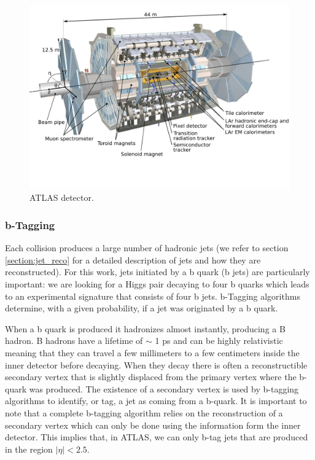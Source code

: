 \begin{figure}
	\centering
	\includegraphics[trim={0cm 3.5cm 0cm 0},clip,width=\textwidth]{./Figures/ATLASsvg3.png}
	\caption{ATLAS detector.}
	\label{fig:ATLAS_detector}
\end{figure} 

\subsubsection{b-Tagging}

Each collision produces a large number of hadronic jets (we refer to section \ref{section:jet_reco} for a detailed description of jets and how they are reconstructed). For this work, jets initiated by a b quark (b jets) are particularly important: we are looking for a Higgs pair decaying to four b quarks which leads to an experimental signature that consists of four b jets. b-Tagging algorithms determine, with a given probability, if a jet was originated by a b quark. 

When a b quark is produced it hadronizes almost instantly, producing a B hadron. B hadrons have a lifetime of $\sim$ 1 ps and can be highly relativistic meaning that they can travel a few millimeters to a few centimeters inside the inner detector before decaying. When they decay there is often a reconstructible secondary vertex that is slightly displaced from the primary vertex where the b-quark was produced. The existence of a secondary vertex is used by b-tagging algorithms to identify, or tag, a jet as coming from a b-quark. It is important to note that a complete b-tagging algorithm relies on the reconstruction of a secondary vertex which can only be done using the information form the inner detector. This implies that, in ATLAS, we can only b-tag jets that are produced in the region $|\eta|<2.5$.

